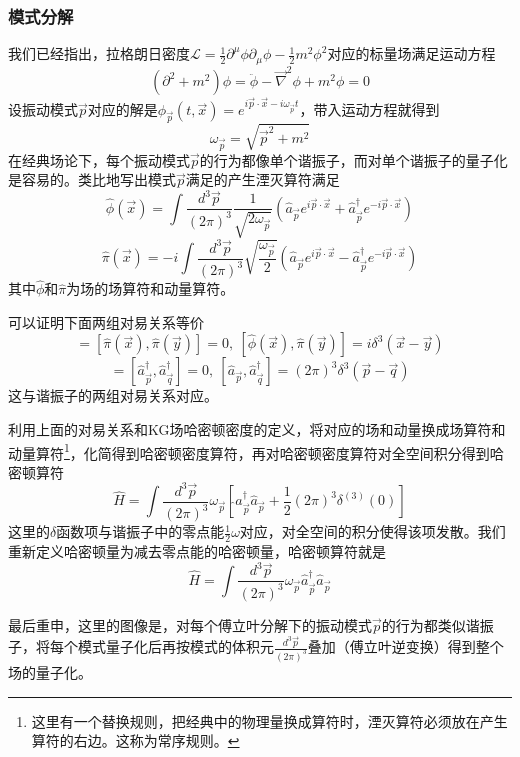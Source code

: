 \documentclass[a4paper,11pt]{ctexart}
\newcommand{\beq}{\begin{equation}}
\newcommand{\eeq}{\end{equation}}
\newcommand{\lagden}{\mathcal{L}}
\begin{document}
\subsubsection{模式分解}
我们已经指出，拉格朗日密度$\lagden = \frac{1}{2} \partial^\mu \phi \partial_\mu \phi - \frac{1}{2}m^2 \phi^2$对应的标量场满足运动方程
\beq
(\partial^2 + m^2) \phi = \ddot{\phi} -\vec{\nabla}^2 \phi+ m^2 \phi = 0
\eeq
设振动模式$\vec{p}$对应的解是$\phi_{\vec{p}} (t,\vec{x}) = e^{i \vec{p} \cdot \vec{x} - i \omega_{\vec{p}} t}$，带入运动方程就得到
\beq
\omega_{\vec{p}} = \sqrt{\vec{p}^2 + m^2}
\eeq
在经典场论下，每个振动模式$\vec{p}$的行为都像单个谐振子，而对单个谐振子的量子化是容易的。类比地写出模式$\vec{p}$满足的产生湮灭算符满足
\beq
\hat{\phi}(\vec{x})  =\int \frac{d^3 \vec{p}}{(2\pi)^3} \frac{1}{\sqrt{2\omega_{\vec{p}}}} (\hat{a}_{\vec{p}} e^{i\vec{p} \cdot \vec{x}} + \hat{a}_{\vec{p}}^\dagger e^{-i\vec{p} \cdot \vec{x}})
\eeq
\beq
\hat{\pi}(\vec{x})  = -i \int \frac{d^3 \vec{p}}{(2\pi)^3} \sqrt{\frac{\omega_{\vec{p}}}{2}}(\hat{a}_{\vec{p}} e^{i\vec{p} \cdot \vec{x}} - \hat{a}_{\vec{p}}^\dagger e^{-i\vec{p} \cdot \vec{x}})
\eeq
其中$\hat{\phi}$和$\hat{\pi}$为场的场算符和动量算符。
\par
可以证明下面两组对易关系等价
\beq
[\hat{\phi}(\vec{x}),\hat{\phi}(\vec{y})] = [\hat{\pi}(\vec{x}),\hat{\pi}(\vec{y})] = 0 ,\ [\hat{\phi}(\vec{x}),\hat{\pi}(\vec{y})] = i\delta^3(\vec{x}-\vec{y})
\eeq
\beq
[\hat{a}_{\vec{p}},\hat{a}_{\vec{q}}] = [\hat{a}_{\vec{p}}^\dagger,\hat{a}_{\vec{q}}^\dagger] = 0 ,\ [\hat{a}_{\vec{p}},\hat{a}_{\vec{q}}^\dagger] = (2\pi)^3 \delta^3(\vec{p}-\vec{q})
\eeq
这与谐振子的两组对易关系对应。
\par
利用上面的对易关系和KG场哈密顿密度的定义，将对应的场和动量换成场算符和动量算符\footnote{这里有一个替换规则，把经典中的物理量换成算符时，湮灭算符必须放在产生算符的右边。这称为常序规则。}，化简得到哈密顿密度算符，再对哈密顿密度算符对全空间积分得到哈密顿算符
\beq
\hat{H} = \int \frac{d^3 \vec{p}}{(2\pi)^3} \omega_{\vec{p}} \left[\hat{}a_{\vec{p}}^{\dagger} \hat{a}_{\vec{p}}+\frac{1}{2}(2 \pi)^{3} \delta^{(3)}(0)\right]
\eeq
这里的$\delta$函数项与谐振子中的零点能$\frac{1}{2}\omega$对应，对全空间的积分使得该项发散。我们重新定义哈密顿量为减去零点能的哈密顿量，哈密顿算符就是
\beq \label{singleham}
\hat{H} = \int \frac{d^3 \vec{p}}{(2\pi)^3} \omega_{\vec{p}} \hat{a}_{\vec{p}}^\dagger \hat{a}_{\vec{p}}
\eeq
\par
最后重申，这里的图像是，对每个傅立叶分解下的振动模式$\vec{p}$的行为都类似谐振子，将每个模式量子化后再按模式的体积元$\frac{d^3\vec{p}}{(2\pi)^3}$叠加（傅立叶逆变换）得到整个场的量子化。
\end{document}
